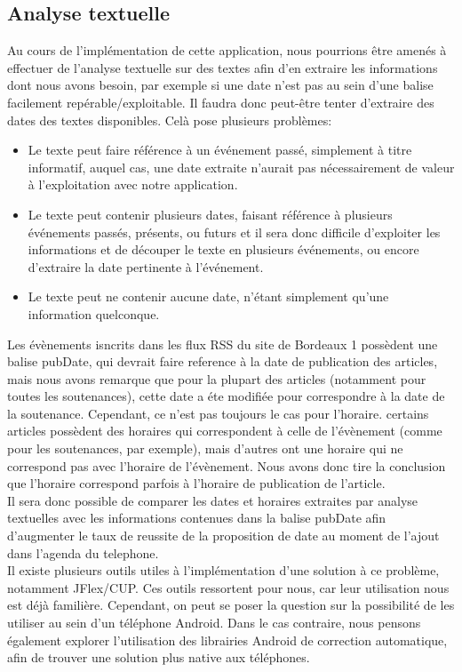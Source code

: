 \documentclass [pdftex,12pt] {report}
\begin{document}
\subsection{Analyse textuelle}
Au cours de l'implémentation de cette application, nous pourrions être amenés à effectuer de l'analyse textuelle sur des textes afin d'en extraire les informations dont nous avons besoin, par exemple si une date n'est pas au sein d'une balise facilement repérable/exploitable. Il faudra donc peut-être tenter d'extraire des dates des textes disponibles. Celà pose plusieurs problèmes:
\begin{itemize}
\renewcommand{\labelitemi}{$\bullet$}
  \item Le texte peut faire référence à un événement passé, simplement à titre informatif, auquel cas, une date extraite n'aurait pas nécessairement de valeur à l'exploitation avec notre application.
  \item Le texte peut contenir plusieurs dates, faisant référence à plusieurs événements passés, présents, ou futurs et il sera donc difficile d'exploiter les informations et de découper le texte en plusieurs événements, ou encore d'extraire la date pertinente à l'événement.
  \item Le texte peut ne contenir aucune date, n'étant simplement qu'une information quelconque.
\end{itemize}
Les évènements isncrits dans les flux RSS du site de Bordeaux 1 possèdent une balise pubDate, qui devrait faire reference à la date de publication des articles, mais nous avons remarque que pour la plupart des articles (notamment pour toutes les soutenances), cette date a éte modifiée pour correspondre à la date de la soutenance. Cependant, ce n'est pas toujours le cas pour l'horaire. certains articles possèdent des horaires qui correspondent à celle de l'évènement (comme pour les soutenances, par exemple), mais d'autres ont une horaire qui ne correspond pas avec l'horaire de l'évènement. Nous avons donc tire la conclusion que l'horaire correspond parfois à l'horaire de publication de l'article.\\
Il sera donc possible de comparer les dates et horaires extraites par analyse textuelles avec les informations contenues dans la balise pubDate afin d'augmenter le taux de reussite de la proposition de date au moment de l'ajout dans l'agenda du telephone.\\
Il existe plusieurs outils utiles à l'implémentation d'une solution à ce problème, notamment JFlex/CUP. Ces outils ressortent pour nous, car leur utilisation nous est déjà familière. Cependant, on peut se poser la question sur la possibilité de les utiliser au sein d'un téléphone Android. Dans le cas contraire, nous pensons également explorer l'utilisation des librairies Android de correction automatique, afin de trouver une solution plus native aux téléphones.\\
\end{document}
